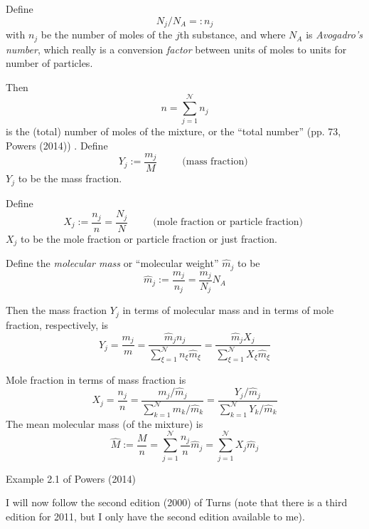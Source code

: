 \documentclass[10pt]{amsart}
\begin{document}
\begin{multicols*}{2}
Define
\[
N_j/N_A =: n_j
\]
with $n_j$ be the number of moles of the $j$th substance, and where $N_A$ is \emph{Avogadro's number}, which really is a conversion \emph{factor} between units of moles to units for number of particles.

Then
\[
n = \sum_{j=1}^{\mathcal{N}} n_j
\]
is the (total) number of moles of the mixture, or the ``total number'' (pp. 73, Powers (2014)) \cite{JPowers2014}.  
Define 
\begin{equation}
  Y_j := \frac{m_j}{M} \qquad \, \text{ (mass fraction) }
\end{equation}  
$Y_j$ to be the mass fraction.  

Define 
\begin{equation}
  X_j := \frac{n_j}{n} = \frac{N_j}{N} \qquad \, \text{ (mole fraction or particle fraction) }
\end{equation}
$X_j$ to be the mole fraction or particle fraction or just fraction.  

Define the \emph{molecular mass} or ``molecular weight'' $\widehat{m}_j$ to be
\begin{equation}
  \widehat{m}_j := \frac{m_j}{n_j} = \frac{m_j}{N_j} N_A
\end{equation}

Then the mass fraction $Y_j$ in terms of molecular mass and in terms of mole fraction, respectively, is
\[
Y_j = \frac{m_j}{m} = \frac{ \widehat{m}_j n_j}{ \sum_{\xi=1}^{\mathcal{N}} n_{\xi} \widehat{m}_{\xi} } = \frac{ \widehat{m}_j X_j }{ \sum_{\xi=1}^{\mathcal{N}} X_{\xi} \widehat{m}_{\xi} }
\]

Mole fraction in terms of mass fraction is 
\[
X_j = \frac{n_j}{n} = \frac{ m_j/\widehat{m}_j }{ \sum_{k=1}^{\mathcal{N}} m_k/\widehat{m}_k } = \frac{ Y_j / \widehat{m}_j }{ \sum_{k=1}^{\mathcal{N}} Y_k / \widehat{m}_k }
\]
The mean molecular mass (of the mixture) is 
\[
\widehat{M} := \frac{M}{n} = \sum_{j=1}^{\mathcal{N}} \frac{n_j}{n} \widehat{m}_j = \sum_{j=1}^{\mathcal{N}} X_j \widehat{m}_j
\]

Example 2.1 of Powers (2014) \cite{JPowers2014}



I will now follow the second edition (2000) of Turns \cite{STurns2011} (note that there is a third edition for 2011, but I only have the second edition available to me).  


\end{multicols*}
\end{document}
